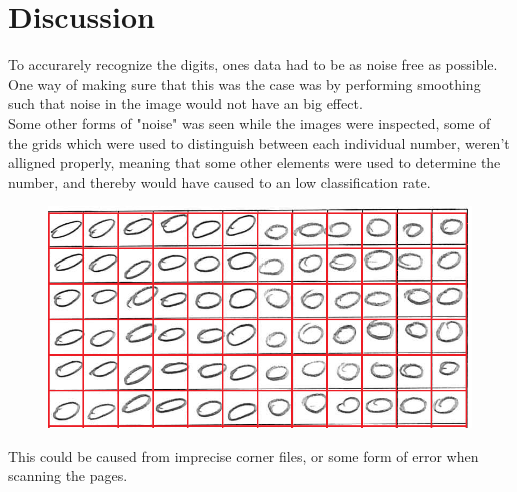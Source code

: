\chapter{Discussion}
To accurarely recognize the digits, ones data had to be as noise free as possible. One way of making sure that this was the case was by performing smoothing such that noise in the image would not have an big effect.\\


Some other forms of "noise" was seen while the images were inspected, some of the grids which were used to distinguish between each individual number, weren't alligned properly, meaning that some other elements were used to determine the number, and thereby would have caused to an low classification rate. 


\begin{figure}[H]
\centering
\includegraphics[width  =\textwidth]{figure/kiddi-01-grid-nosmooth-300dpi_cut.png}
\end{figure}

This could be caused from imprecise corner files, or some form of error when scanning the pages. \\


